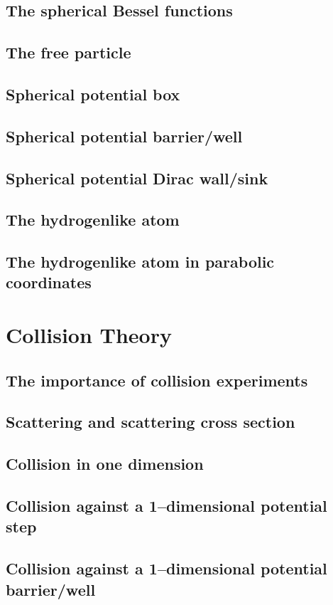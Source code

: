 \documentclass{article}
\begin{document}
\subsection{The spherical Bessel functions}
\subsection{The free particle}
\subsection{Spherical potential box}
\subsection{Spherical potential barrier/well}
\subsection{Spherical potential Dirac wall/sink}
\subsection{The hydrogenlike atom}
\subsection{The hydrogenlike atom in parabolic coordinates}
\section{Collision Theory}
\subsection{The importance of collision experiments}
\subsection{Scattering and scattering cross section}
\subsection{Collision in one dimension}
\subsection{Collision against a 1–dimensional potential step}
\subsection{Collision against a 1–dimensional potential barrier/well}
\end{document}
